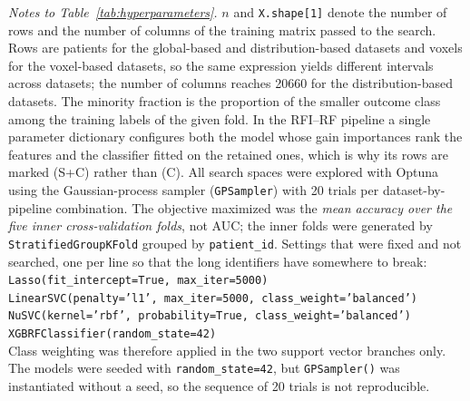 \smallskip
{\footnotesize
\sloppy
\noindent
\textit{Notes to Table~\ref{tab:hyperparameters}.}
$n$ and \texttt{X.shape[1]} denote the number of rows and the number of columns of the training matrix passed to the search.
Rows are patients for the global-based and distribution-based datasets and voxels for the voxel-based datasets, so the same expression yields different intervals across datasets; the number of columns reaches 20660 for the distribution-based datasets.
The minority fraction is the proportion of the smaller outcome class among the training labels of the given fold.
In the RFI--RF pipeline a single parameter dictionary configures both the model whose gain importances rank the features and the classifier fitted on the retained ones, which is why its rows are marked (S+C) rather than (C).
All search spaces were explored with Optuna using the Gaussian-process sampler (\texttt{GPSampler}) with 20 trials per dataset-by-pipeline combination.
The objective maximized was the \emph{mean accuracy over the five inner cross-validation folds}, not AUC; the inner folds were generated by \texttt{StratifiedGroupKFold} grouped by \texttt{patient\_id}.
Settings that were fixed and not searched, one per line so that the long identifiers have somewhere to break:\\
\texttt{Lasso(fit\_intercept=True, max\_iter=5000)}\\
\texttt{LinearSVC(penalty='l1', max\_iter=5000, class\_weight='balanced')}\\
\texttt{NuSVC(kernel='rbf', probability=True, class\_weight='balanced')}\\
\texttt{XGBRFClassifier(random\_state=42)}\\
Class weighting was therefore applied in the two support vector branches only.
The models were seeded with \texttt{random\_state=42}, but \texttt{GPSampler()} was instantiated without a seed, so the sequence of 20 trials is not reproducible.
\par}

\clearpage

